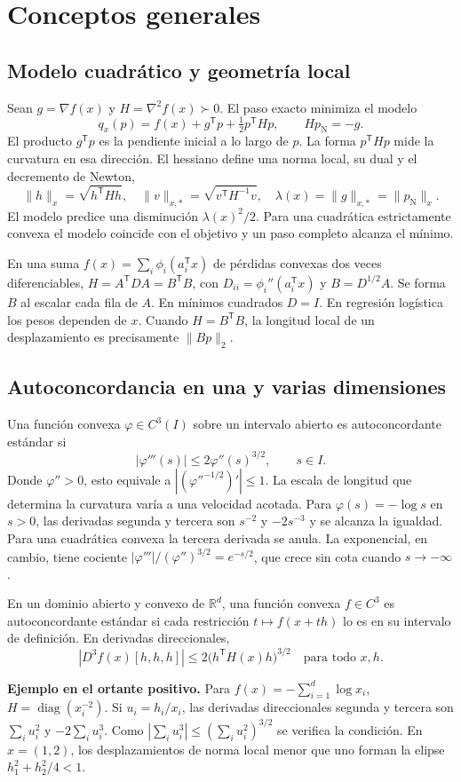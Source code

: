 \documentclass[11pt,a4paper]{article}
\newcommand{\R}{\mathbb R}
\newcommand{\T}{^{\mathsf T}}
\newcommand{\nrm}[1]{\lVert #1\rVert}
\newcommand{\pN}{p_{\mathrm N}}
\DeclareMathOperator{\diag}{diag}
\newcommand{\tema}[1]{\smallskip\par\textbf{#1}\enspace\ignorespaces}
\begin{document}
\section{Conceptos generales}\label{sec:conceptos}
\subsection{Modelo cuadrático y geometría local}
Sean $g=\nabla f(x)$ y $H=\nabla^2 f(x)\succ0$. El paso exacto minimiza el modelo
\begin{equation}
 q_x(p)=f(x)+g\T p+\tfrac12p\T Hp,\qquad H\pN=-g.\label{eq:modelo}
\end{equation}
El producto $g\T p$ es la pendiente inicial a lo largo de $p$. La forma $p\T Hp$ mide la curvatura en esa dirección. El hessiano define una norma local, su dual y el decremento de Newton,
\begin{equation}
 \nrm h_x=\sqrt{h\T Hh},\quad \nrm v_{x,*}=\sqrt{v\T H^{-1}v},\quad
 \lambda(x)=\nrm g_{x,*}=\nrm{\pN}_x.\label{eq:decremento}
\end{equation}
El modelo predice una disminución $\lambda(x)^2/2$. Para una cuadrática estrictamente convexa el modelo coincide con el objetivo y un paso completo alcanza el mínimo.

En una suma $f(x)=\sum_i\phi_i(a_i\T x)$ de pérdidas convexas dos veces diferenciables, $H=A\T DA=B\T B$, con $D_{ii}=\phi_i''(a_i\T x)$ y $B=D^{1/2}A$. Se forma $B$ al escalar cada fila de $A$. En mínimos cuadrados $D=I$. En regresión logística los pesos dependen de $x$. Cuando $H=B\T B$, la longitud local de un desplazamiento es precisamente $\nrm{Bp}_2$.

\subsection{Autoconcordancia en una y varias dimensiones}
Una función convexa $\varphi\in C^3(I)$ sobre un intervalo abierto es autoconcordante estándar si
\[
 |\varphi'''(s)|\le2\varphi''(s)^{3/2},\qquad s\in I .
\]
Donde $\varphi''>0$, esto equivale a $|(\varphi''^{-1/2})'|\le1$. La escala de longitud que determina la curvatura varía a una velocidad acotada. Para $\varphi(s)=-\log s$ en $s>0$, las derivadas segunda y tercera son $s^{-2}$ y $-2s^{-3}$ y se alcanza la igualdad. Para una cuadrática convexa la tercera derivada se anula. La exponencial, en cambio, tiene cociente $|\varphi'''|/(\varphi'')^{3/2}=e^{-s/2}$, que crece sin cota cuando $s\to-\infty$.

En un dominio abierto y convexo de $\R^d$, una función convexa $f\in C^3$ es autoconcordante estándar si cada restricción $t\mapsto f(x+th)$ lo es en su intervalo de definición. En derivadas direccionales,
\[
 |D^3 f(x)[h,h,h]|\le 2\bigl(h\T H(x)h\bigr)^{3/2}\quad\text{para todo }x,h .
\]
\tema{Ejemplo en el ortante positivo.}
Para $f(x)=-\sum_{i=1}^d\log x_i$, $H=\diag(x_i^{-2})$. Si $u_i=h_i/x_i$, las derivadas direccionales segunda y tercera son $\sum_i u_i^2$ y $-2\sum_i u_i^3$. Como $|\sum_i u_i^3|\le(\sum_i u_i^2)^{3/2}$ se verifica la condición. En $x=(1,2)$, los desplazamientos de norma local menor que uno forman la elipse $h_1^2+h_2^2/4<1$.
\end{document}
